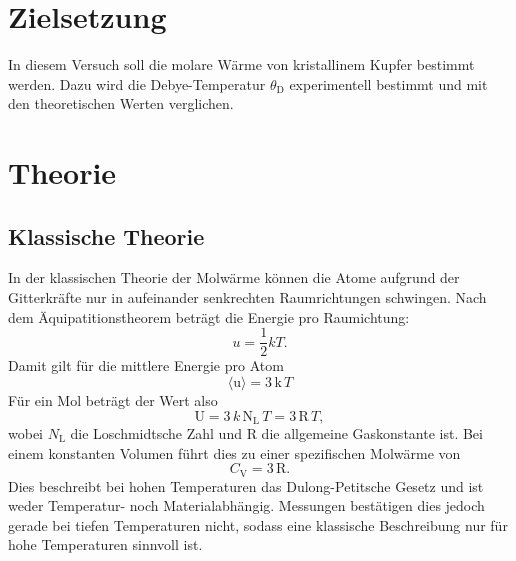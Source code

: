 \section{Zielsetzung}
\label{sec:Zielsetzung}
In diesem Versuch soll die molare Wärme von kristallinem Kupfer bestimmt werden.
Dazu wird die Debye-Temperatur $\theta_\text{D}$ experimentell bestimmt und mit den theoretischen
Werten verglichen.

\section{Theorie}
\label{sec:Theorie}

\subsection{Klassische Theorie}
\label{sec:Klassische Theorie}
In der klassischen Theorie der Molwärme können die Atome aufgrund der Gitterkräfte nur
in aufeinander senkrechten Raumrichtungen schwingen. Nach dem Äquipatitionstheorem beträgt
die Energie pro Raumichtung:
\begin{equation}
  u = \frac{1}{2} k T.
\end{equation}
Damit gilt für die mittlere Energie pro Atom
\begin{equation}
  \langle \text{u} \rangle = 3\,\text{k}\,T
\end{equation}
Für ein Mol beträgt der Wert also
\begin{equation}
  \text{U} = 3\, k\, \text{N}_\text{L}\, T = 3\,\text{R}\,T,
\end{equation}
wobei $N_\text{L}$ die Loschmidtsche Zahl und $\text{R}$ die allgemeine Gaskonstante ist.
Bei einem konstanten Volumen führt dies zu einer spezifischen Molwärme von
\begin{equation}
  C_\text{V} = 3\,\text{R}.
\end{equation}
Dies beschreibt bei hohen Temperaturen das Dulong-Petitsche Gesetz und ist weder
Temperatur- noch Materialabhängig.
Messungen bestätigen dies jedoch gerade bei tiefen Temperaturen nicht,
sodass eine klassische Beschreibung nur für hohe Temperaturen sinnvoll ist.

